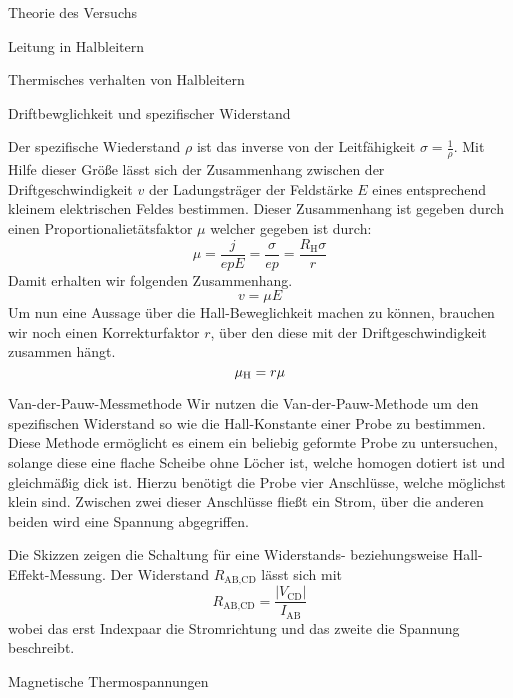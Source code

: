\documentclass[pdftex, a4paper,11pt, twoside, ngerman]{report}
\newcommand\abs[1]{\left| #1 \right|}
\begin{document}
\begin{chapter}{Theorie des Versuchs}
\begin{section}{Leitung in Halbleitern}
\begin{subsection}{Thermisches verhalten von Halbleitern}
        \end{subsection}

        \begin{subsection}{Driftbewglichkeit und spezifischer Widerstand}

            Der spezifische Wiederstand $\rho$ ist das inverse von der Leitfähigkeit $\sigma = \frac 1\rho$.
            Mit Hilfe dieser Größe lässt sich der Zusammenhang zwischen der Driftgeschwindigkeit $v$ der Ladungsträger der Feldstärke $E$ eines entsprechend kleinem elektrischen Feldes bestimmen.
            Dieser Zusammenhang ist gegeben durch einen Proportionalietätsfaktor $\mu$ welcher gegeben ist durch:
            \[
                \mu = \frac j{epE} = \frac \sigma{ep} = \frac{R_\text{H} \sigma}r
            \]
            Damit erhalten wir folgenden Zusammenhang.
            \[
                v = \mu E
            \]
            Um nun eine Aussage über die Hall-Beweglichkeit machen zu können, brauchen wir noch einen Korrekturfaktor $r$, über den diese mit der Driftgeschwindigkeit zusammen hängt.
            \[
                \mu_\text H =r\mu
            \]

        \end{subsection}

        \begin{subsection}{Van-der-Pauw-Messmethode}
            Wir nutzen die Van-der-Pauw-Methode um den spezifischen Widerstand so wie die Hall-Konstante einer Probe zu bestimmen.
            Diese Methode ermöglicht es einem ein beliebig geformte Probe zu untersuchen, solange diese eine flache Scheibe ohne Löcher ist, welche homogen dotiert ist und gleichmäßig dick ist.
            Hierzu benötigt die Probe vier Anschlüsse, welche möglichst klein sind. 
            Zwischen zwei dieser Anschlüsse fließt ein Strom, über die anderen beiden wird eine Spannung abgegriffen.

            Die Skizzen zeigen die Schaltung für eine Widerstands- beziehungsweise Hall-Effekt-Messung.
            Der Widerstand $R_\text{AB,CD}$ lässt sich mit 
            \[
                R_\text{AB,CD} = \frac{\abs{V_\text{CD}}}{I_\text{AB}}
            \]
            wobei das erst Indexpaar die Stromrichtung und das zweite die Spannung beschreibt. 

        \end{subsection}

        \begin{subsection}{Magnetische Thermospannungen}


\end{subsection}
\end{section}
\end{chapter}
\end{document}
